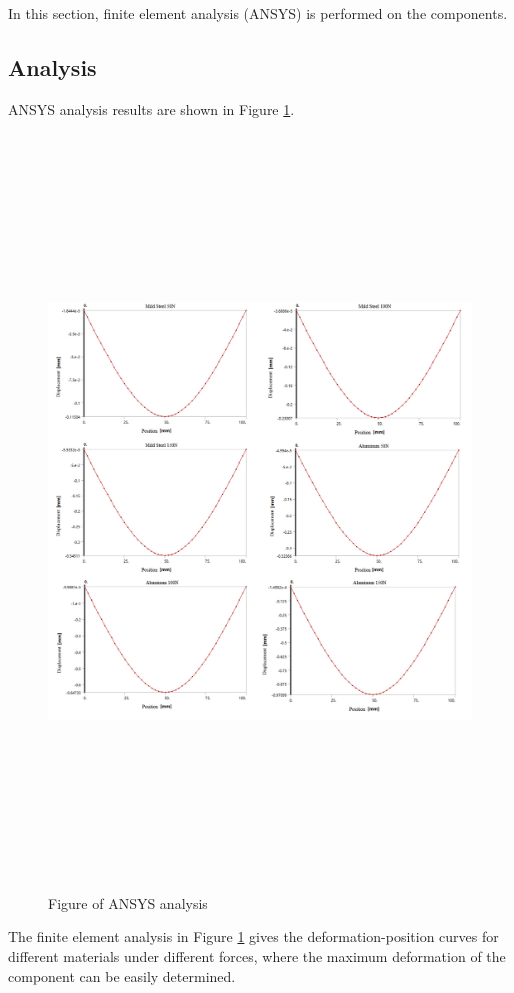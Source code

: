 \iffalse

In this section, finite element analysis (ANSYS) is performed on the components.

\subsection*{Analysis}

ANSYS analysis results are shown in Figure \ref{f2}.

\begin{figure}[htbp]
    \centering
    \includegraphics[width=18cm,height=20cm]{./fig/mix2.jpg}
    \caption{Figure of ANSYS analysis}
    \label{f2}
\end{figure}


The finite element analysis in Figure \ref{f2} gives the deformation-position 
curves for different materials under different forces, 
where the maximum deformation of the component can be easily determined.

